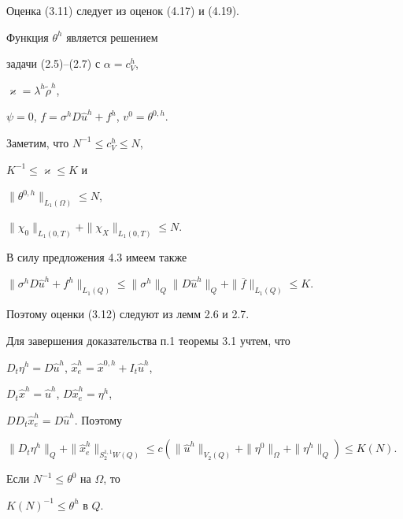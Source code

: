 \documentclass[12pt]{article}
\theoremstyle{plain} %
\newtheorem{propm}{\hskip\parindent Предложение}[section]
\theoremstyle{definition}
\numberwithin{equation}{section}
\begin{document}
\begin{pf} Оценка (3.11) следует из оценок (4.17) и (4.19).





Функция $\theta^h$ является решением


задачи (2.5)--(2.7) с $\alpha= c^h_V$,


$\varkappa=\lambda^h\widetilde\rho^h$,


$\psi=0$, $f=\sigma^h D\widehat u^h + f^h$, $v^0=\theta^{0,h}$.


Заметим, что $N^{-1}\le c^h_V \le N$,


$K^{-1}\le \varkappa\le K$ и


$\|\theta^{0,h}\|_{L_1(\Omega)}\le N$,


$\|\chi_0\|_{L_1(0,T)}+\|\chi_X\|_{L_1(0,T)}\le N$.


В силу предложения 4.3 имеем также


$\|\sigma^h D\widehat u^h + f^h\|_{L_1(Q)}\le


\|\sigma^h\|_Q\|D\widehat u^h\|_Q+


\|\overline f\|_{L_1(Q)}\le K$.


Поэтому оценки (3.12) следуют из лемм 2.6 и 2.7.


\end{pf}





Для завершения доказательства п.1 теоремы 3.1 учтем, что


$D_t\eta^h=D\widehat u^h$, $\widehat x^h_e=\widehat x^{0,h}+I_t\widehat u^h$,


$D_t\widehat x^h=\widehat u^h$, $D\widehat x^h_e=\eta^h$,


$DD_t\widehat x^h_e=D\widehat u^h$. Поэтому


$\|D_t\eta^h\|_Q+\|\widehat x_e^h\|_{S_2^{1,1}W(Q)}\le


c(\|\widehat u^h \|_{V_2(Q)}+\|\eta^0\|_\Omega + \|\eta^h\|_Q)\le K(N)$.





\begin{propm} Если $N^{-1}\le\theta^0$ на $\Omega$, то


$K(N)^{-1}\le\theta^h$ в $Q$.


\end{propm}
\end{document}
